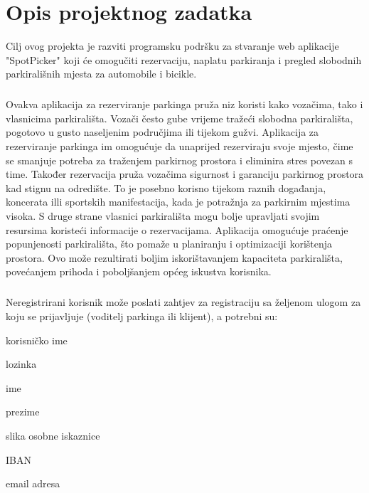 \chapter{Opis projektnog zadatka}


{Cilj ovog projekta je razviti programsku podršku za stvaranje web aplikacije "SpotPicker" koji će omogučiti rezervaciju, naplatu parkiranja i pregled slobodnih parkirališnih mjesta za automobile i bicikle. }
\paragraph*{}{Ovakva aplikacija za rezerviranje parkinga pruža niz koristi kako vozačima, tako i vlasnicima parkirališta. Vozači često gube vrijeme tražeći slobodna parkirališta, pogotovo u gusto naseljenim područjima ili tijekom gužvi. Aplikacija za rezerviranje parkinga im omogućuje da unaprijed rezerviraju svoje mjesto, čime se smanjuje potreba za traženjem parkirnog prostora i eliminira stres povezan s time. Također rezervacija pruža vozačima sigurnost i garanciju parkirnog prostora kad stignu na odredište. To je posebno korisno tijekom raznih događanja, koncerata illi sportskih manifestacija, kada je potražnja za parkirnim mjestima visoka. S druge strane vlasnici parkirališta mogu bolje upravljati svojim resursima koristeći informacije o rezervacijama. Aplikacija omogućuje praćenje popunjenosti parkirališta, što pomaže u planiranju i optimizaciji korištenja prostora. Ovo može rezultirati boljim iskorištavanjem kapaciteta parkirališta, povećanjem prihoda i poboljšanjem općeg iskustva korisnika.}
\paragraph*{}{Neregistrirani korisnik može poslati zahtjev za registraciju sa željenom ulogom za koju se prijavljuje (voditelj parkinga ili klijent), a potrebni su: }
\begin{packed_item}
	\item {korisničko ime}
	\item {lozinka}
	\item {ime}
	\item {prezime}
	\item {slika osobne iskaznice}
	\item {IBAN}
	\item {email adresa}
\end{packed_item}

